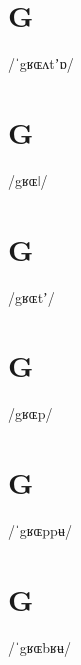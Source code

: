 \documentclass[10pt,a4paper,twoside]{book}
\begin{document}
\section*{G}

\begin{multicols}{3}
 {/ˈgʁɶʌtʼɒ/} {}
\end{multicols}

\section*{G}

\begin{multicols}{3}
 {/gʁɶǀ/} {}
\end{multicols}

\section*{G}

\begin{multicols}{3}
 {/gʁɶtʼ/} {}
\end{multicols}

\section*{G}

\begin{multicols}{3}
 {/gʁɶp/} {}
\end{multicols}

\section*{G}

\begin{multicols}{3}
 {/ˈgʁɶppʉ/} {}
\end{multicols}

\section*{G}

\begin{multicols}{3}
 {/ˈgʁɶbʁʉ/} {}
\end{multicols}
\end{document}
